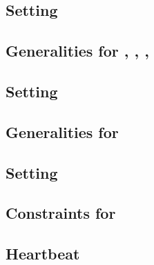 \subsection{Setting \accInputs{}}                                           \label{bls: setting acc pairings}                               

\subsection{Generalities for \malformedDataInternalJustification{}, \malformedDataExternalJustification{}, \wellformedDataTrivial{}, \wellformedDataNonTrivial{}} \label{bls: generalities for malformed and wellformed} 

\subsection{Setting \malformedDataInternalJustification{}}                  \label{bls: malformed data internal justification}              

\subsection{Generalities for \pairOfPointsContainsInfinity{}}               \label{bls: generalities for pair of points contains infinity}  

\subsection{Setting \trivialAcc{}}                                         \label{bls: setting trivial}                                           

\subsection{Constraints for \blsStamp{}}                                    \label{bls: stamp}                                              
\subsection{Heartbeat}                                                      \label{bls: heartbeat}                                          
